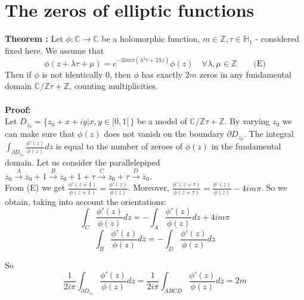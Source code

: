 \documentclass[10pt,a4paper]{article}
\begin{document}
\section{The zeros of elliptic functions}
\textbf{Theorem :} Let $\phi:\mathbb{C}\rightarrow\mathbb{C}$ be a holomorphic function, $m\in\mathbb{Z},\tau\in\mathbb{H}_1$ - considered fixed here. We assume that
\[\phi(z+\lambda\tau+\mu)=e^{-2im\pi(\lambda^2\tau+2\lambda z)}\phi(z)\quad\forall\lambda,\mu\in\mathbb{Z}\qquad\textrm{(E)}\]
Then if $\phi$ is not identically 0, then $\phi$ has exactly $2m$ zeros in any fundamental domain $\mathbb{C}/\mathbb{Z}\tau+\mathbb{Z}$, counting multiplicities.\\
\\
\textbf{Proof: }
\\
Let $D_{z_0}=\{z_0+x+iy|x,y\in[0,1[\,\}$ be a model of $\mathbb{C}/\mathbb{Z}\tau+\mathbb{Z}$. By varying $z_0$ we can make sure that $\phi(z)$ does not vanish on the boundary $\partial D_{z_0}$. The integral $\int_{\partial D_{z_0}}\frac{\phi'(z)}{\phi(z)}dz$ is equal to the number of zeroes of $\phi(z)$ in the fundamental domain. Let us consider the parallelepiped $z_0\overset{A}{\rightarrow }z_0+1\overset{B}{\rightarrow} z_0+1+\tau\overset{C}{\rightarrow} z_0+\tau\overset{D}{\rightarrow} z_0$.
\\
From (E) we get $\frac{\phi'(z+1)}{\phi(z+1)}=\frac{\phi'(z)}{\phi(z)}$. 
Moreover, $\frac{\phi'(z+\tau)}{\phi(z+\tau)}=\frac{\phi'(z)}{\phi(z)}-4im\pi$. So we obtain, taking into account the orientations:
\[\int_C\frac{\phi'(z)}{\phi(z)}dz=-\int_A\frac{\phi'(z)}{\phi(z)}dz+4im\pi\]
\[\int_B\frac{\phi'(z)}{\phi(z)}dz=-\int_D\frac{\phi'(z)}{\phi(z)}dz\]

So
\[\frac{1}{2i\pi}\int_{\partial D_{z_0}}\frac{\phi'(z)}{\phi(z)}dz=\frac{1}{2i\pi}\int_{ABCD}\frac{\phi'(z)}{\phi(z)}dz=2m\]
\end{document}
